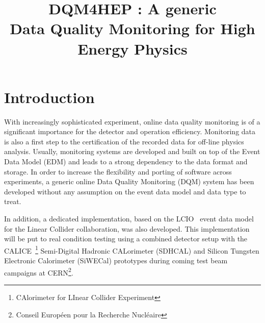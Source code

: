 \documentclass[conference]{IEEEtran}
\begin{document}
\title{DQM4HEP : A generic\\Data Quality Monitoring for High Energy Physics}

\author{


\and


\and


}

\maketitle

\IEEEpeerreviewmaketitle

\section{Introduction}

With increasingly sophisticated experiment, online data quality monitoring is of a significant importance for the detector and operation efficiency. Monitoring data is also a first step to the certification of the recorded data for off-line physics analysis. Usually, monitoring systems are developed and built on top of the Event Data Model (EDM) and leads to a strong dependency to the data format and storage. In order to increase the flexibility and porting of software across experiments, a generic online Data Quality Monitoring (DQM) system has been developed without any assumption on the event data model and data type to treat.

In addition, a dedicated implementation, based on the LCIO~\cite{LCIO} event data model for the Linear Collider collaboration, was also developed. This implementation will be put to real condition testing using a combined detector setup with the CALICE~\footnote{CAlorimeter for LInear Collider Experiment} Semi-Digital Hadronic CALorimeter (SDHCAL) and Silicon Tungsten Electronic Calorimeter (SiWECal) prototypes during coming test beam campaigns at CERN\footnote{Conseil Européen pour la Recherche Nucléaire}.
\end{document}
